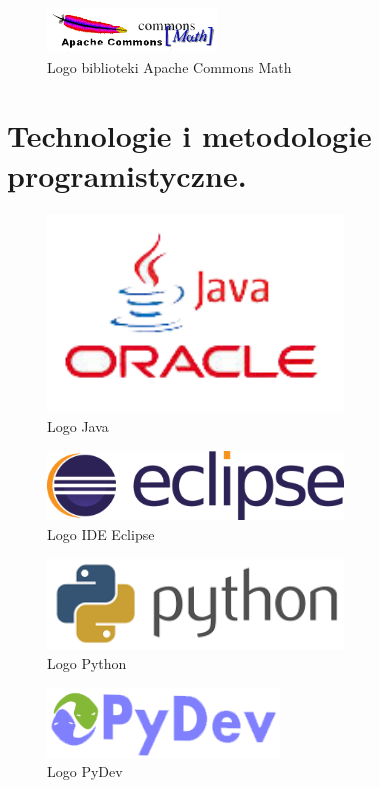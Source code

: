 \documentclass[twoside,12pt]{report}
\begin{document}
\begin{figure}[ht]
\includegraphics[width=0.40\textwidth]{img/math}
\caption{Logo biblioteki Apache Commons Math \cite{math}} 
\end{figure}



\section{Technologie i metodologie programistyczne.}

\begin{figure}[ht]
\includegraphics[width=0.7\textwidth]{img/java}
\caption{Logo Java\cite{java}}
\end{figure}
\begin{figure}[ht]
\includegraphics[width=0.7\textwidth]{img/eclipse}
\caption{Logo IDE Eclipse\cite{eclipse}}
\end{figure}


\begin{figure}[ht]
\includegraphics[width=0.7\textwidth]{img/py}
\caption{Logo Python\cite{python}}
\end{figure}
\begin{figure}[ht]
\includegraphics[width=0.55\textwidth]{img/pydev}
\caption{Logo PyDev\cite{pydev}}
\end{figure}
\end{document}
